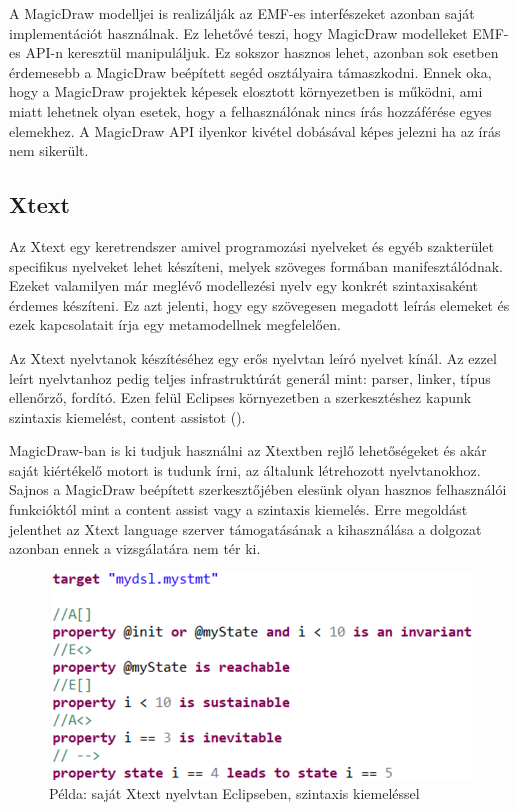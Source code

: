 A MagicDraw modelljei is realizálják az EMF-es interfészeket azonban saját implementációt használnak. Ez lehetővé teszi, hogy MagicDraw modelleket EMF-es API-n keresztül manipuláljuk. Ez sokszor hasznos lehet, azonban sok esetben érdemesebb a MagicDraw beépített segéd osztályaira támaszkodni. Ennek oka, hogy a MagicDraw projektek képesek elosztott környezetben is működni, ami miatt lehetnek olyan esetek, hogy a felhasználónak nincs írás hozzáférése egyes elemekhez. A MagicDraw API ilyenkor kivétel dobásával képes jelezni ha az írás nem sikerült.

\subsection{Xtext}

Az Xtext egy keretrendszer amivel programozási nyelveket és egyéb szakterület specifikus nyelveket lehet készíteni, melyek szöveges formában manifesztálódnak. Ezeket valamilyen már meglévő modellezési nyelv egy konkrét szintaxisaként érdemes készíteni. Ez azt jelenti, hogy egy szövegesen megadott leírás elemeket és ezek kapcsolatait írja egy metamodellnek megfelelően.

Az Xtext nyelvtanok készítéséhez egy erős nyelvtan leíró nyelvet kínál. Az ezzel leírt nyelvtanhoz pedig teljes infrastruktúrát generál mint: parser, linker, típus ellenőrző, fordító. Ezen felül Eclipses környezetben a szerkesztéshez kapunk szintaxis kiemelést, content assistot ().

MagicDraw-ban is ki tudjuk használni az Xtextben rejlő lehetőségeket és akár saját kiértékelő motort is tudunk írni, az általunk létrehozott nyelvtanokhoz. Sajnos a MagicDraw beépített szerkesztőjében elesünk olyan hasznos felhasználói funkcióktól mint a content assist vagy a szintaxis kiemelés. Erre megoldást jelenthet az Xtext language szerver támogatásának a kihasználása a dolgozat azonban ennek a vizsgálatára nem tér ki.


\begin{figure}[!ht]
	\centering
	\includegraphics[width=120mm, keepaspectratio]{figures/preliminaries/ctl-language.png}
	\caption[]{Példa: saját Xtext nyelvtan Eclipseben, szintaxis kiemeléssel}
	\label{fig:ctl-lang}
\end{figure}


